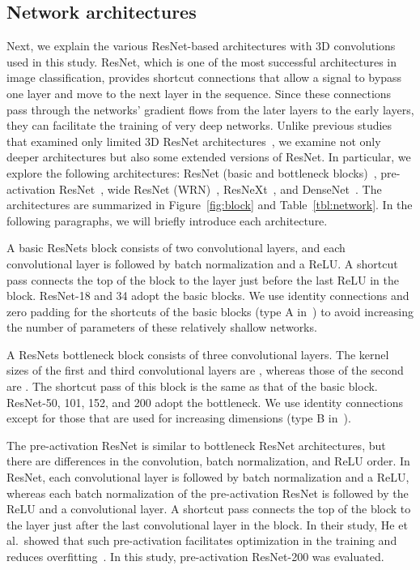 \documentclass[10pt,twocolumn,letterpaper]{article}
\begin{document}
  \subsection{Network architectures}
    Next, we explain the various ResNet-based architectures with 3D convolutions used in this study.
    ResNet, which is one of the most successful architectures in image classification,
    provides shortcut connections that allow a signal to bypass one layer and move to the next layer in the sequence.
    Since these connections pass through the networks' gradient flows from the later layers to the early layers,
    they can facilitate the training of very deep networks.
    Unlike previous studies that examined only limited 3D ResNet architectures~\cite{Hara_2017_ICCV_Workshops,res3d},
    we examine not only deeper architectures but also some extended versions of ResNet.
    In particular, we explore the following architectures:
    ResNet (basic and bottleneck blocks)~\cite{ResNet},
    pre-activation ResNet~\cite{He2016}, wide ResNet (WRN)~\cite{WideResNet},
    ResNeXt~\cite{resnext}, and DenseNet~\cite{densenets}.
    The architectures are summarized in Figure~\ref{fig:block} and Table~\ref{tbl:network}.
    In the following paragraphs, we will briefly introduce each architecture.

    A basic ResNets block consists of two convolutional layers, and
    each convolutional layer is followed by batch normalization and a ReLU.\@
    A shortcut pass connects the top of the block to the layer just before the last ReLU in the block.
    ResNet-18 and 34 adopt the basic blocks.
    We use identity connections and zero padding for the shortcuts of the basic blocks (type A in~\cite{ResNet})
    to avoid increasing the number of parameters of these relatively shallow networks.

    A ResNets bottleneck block consists of three convolutional layers.
    The kernel sizes of the first and third convolutional layers are ,
    whereas those of the second are .
    The shortcut pass of this block is the same as that of the basic block.
    ResNet-50, 101, 152, and 200 adopt the bottleneck.
    We use identity connections except for those that are used for increasing dimensions (type B in~\cite{ResNet}).

    The pre-activation ResNet is similar to bottleneck ResNet architectures,
    but there are differences in the convolution, batch normalization, and ReLU order.
    In ResNet, each convolutional layer is followed by batch normalization and a ReLU,
    whereas each batch normalization of the pre-activation ResNet is followed by the ReLU and a convolutional layer.
    A shortcut pass connects the top of the block to the layer just after the last convolutional layer in the block.
    In their study, He et al.\ showed that such pre-activation facilitates optimization in the training and reduces overfitting~\cite{He2016}.
    In this study, pre-activation ResNet-200 was evaluated.
\end{document}
